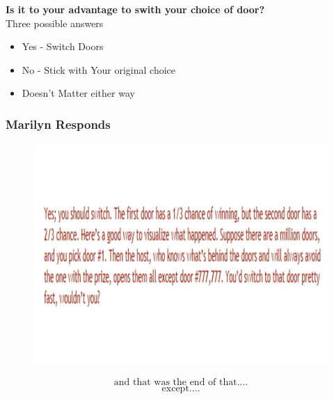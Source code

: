 \documentclass{beamer}
\begin{document}
\begin{frame}
\Large

\textbf{Is it to your advantage to swith your choice of door?}\\ \bigskip
Three possible answers 
\begin{itemize}
\item Yes - Switch Doors \bigskip

\item No - Stick with Your original choice \bigskip

\item Doesn't Matter either way
\end{itemize}
\end{frame}
\begin{frame}
\frametitle{Marilyn Responds}
		\begin{figure}
		\centering
		\includegraphics[width=1.0\linewidth]{MontyHall/Slide5}
		
	\end{figure}
		
\end{frame}
\begin{frame}
	\LARGE
	\[ \mbox{and that was the end of that....} \]
	\bigskip
		\LARGE
		\[ \mbox{except....} \]
\end{frame}
\end{document}

